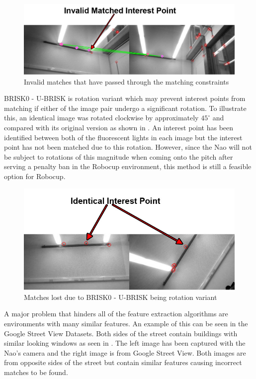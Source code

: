 \documentclass[11pt]{report}
\begin{document}
\begin{figure}
  \centering
    \includegraphics[width=1.0\textwidth]{../Drawings/Matching/dataset_valid_invalid_matches_photo.jpg}
    \caption{Invalid matches that have passed through the matching constraints} 
    \label{fig:weak}
\end{figure}

BRISK0 - U-BRISK is rotation variant which may prevent interest points from matching if either of the image pair undergo a significant rotation. To illustrate this, an identical image was  rotated clockwise by approximately $45^{\circ}$ and compared with its original version as shown in . An interest point has been identified between both of the fluorescent lights in each image but the interest point has not been matched due to this rotation. However, since the Nao will not be subject to rotations of this magnitude when coming onto the pitch after serving a penalty ban in the Robocup environment, this method is still a feasible option for Robocup. \\

\begin{figure}
  \centering
    \includegraphics[width=1.0\textwidth]{../Drawings/Matching/rotationsUBRISK_photo.jpg}
    \caption{Matches lost due to BRISK0 - U-BRISK being rotation variant} 
    \label{fig:rotationUbrisk}
\end{figure}

A major problem that hinders all of the feature extraction algorithms are environments with many similar features. An example of this can be seen in the Google Street View Datasets. Both sides of the street contain buildings with similar looking windows as seen in . The left image has been captured with the Nao's camera and the right image is from Google Street View. Both images are from opposite sides of the street but contain similar features causing incorrect matches to be found.\\
\end{document}
